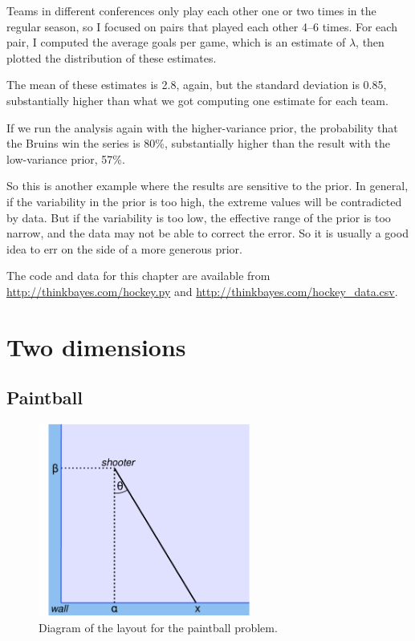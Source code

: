 \documentclass[12pt]{book}
\begin{document}
Teams in different conferences only play each other one or two
times in the regular season, so I focused on pairs that played
each other 4--6 times.  For each pair, I computed the average
goals per game, which is an estimate of $\lambda$, then plotted
the distribution of these estimates.

The mean of these estimates is 2.8, again, but the standard
deviation is 0.85, substantially higher than what we got computing
one estimate for each team.

If we run the analysis again with the higher-variance prior, the
probability that the Bruins win the series is 80\%, substantially
higher than the result with the low-variance prior, 57\%.

So this is another example where the results are sensitive to the
prior.  In general, if the variability in the prior is too high, the
extreme values will be contradicted by data.  But if the
variability is too low, the effective range of the prior is too
narrow, and the data may not be able to correct the error.  So it is
usually a good idea to err on the side of a more generous prior.

The code and data for this chapter are available from
\url{http://thinkbayes.com/hockey.py} and
\url{http://thinkbayes.com/hockey_data.csv}.


\chapter{Two dimensions}

\section{Paintball}

\begin{figure}
\centerline{\includegraphics[height=2.5in]{figs/paintball.pdf}}
\caption{Diagram of the layout for the paintball problem.}
\label{fig.paintball}
\end{figure}
\end{document}
